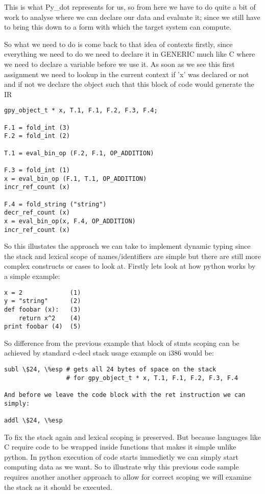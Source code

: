 \documentclass[defaultstyle,11pt]{article}
\begin{document}
This is what Py\_dot represents for us, so from here we have to do quite a bit of work to analyse where we can declare our data
and evaluate it; since we still have to bring this down to a form with which the target system can compute. 

So what we need to do is come back to that idea of contexts firstly, since everything we need to do we need to declare it in GENERIC
much like C where we need to declare a variable before we use it. As soon as we see this first assignment we need to lookup in the
current context if 'x' was declared or not and if not we declare the object such that this block of code would generate the IR

\begin{lstlisting}
gpy_object_t * x, T.1, F.1, F.2, F.3, F.4;

F.1 = fold_int (3)
F.2 = fold_int (2)

T.1 = eval_bin_op (F.2, F.1, OP_ADDITION)

F.3 = fold_int (1)
x = eval_bin_op (F.1, T.1, OP_ADDITION)
incr_ref_count (x)

F.4 = fold_string ("string")
decr_ref_count (x)
x = eval_bin_op(x, F.4, OP_ADDITION)
incr_ref_count (x)
\end{lstlisting}

So this illustates the approach we can take to implement dynamic typing since the stack and lexical scope of names/identifiers
are simple but there are still more complex constructs or cases to look at. Firstly lets look at how python works by a simple example:

\begin{lstlisting}
x = 2             (1)
y = "string"      (2)
def foobar (x):   (3)
    return x^2    (4)
print foobar (4)  (5)
\end{lstlisting}

So difference from the previous example that block of stmts scoping can be achieved by standard c-decl stack usage example on i386
would be:

\begin{lstlisting}
subl \$24, \%esp # gets all 24 bytes of space on the stack 
                 # for gpy_object_t * x, T.1, F.1, F.2, F.3, F.4

And before we leave the code block with the ret instruction we can simply:

addl \$24, \%esp
\end{lstlisting}

To fix the stack again and lexical scoping is preserved. But because languages like C require code to be wrapped inside functions
that makes it simple unlike python. In python execution of code starts immedietly we can simply start computing data as we want.
So to illustrate why this previous code sample requires another another approach to allow for correct scoping we will examine the stack
as it should be executed.
\end{document}
